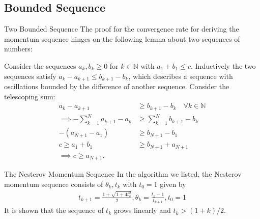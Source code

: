 \documentclass[11pt]{beamer}
\begin{document}
    \subsection{Bounded Sequence}
        \begin{frame}{Two Bounded Sequence}
            The proof for the convergence rate for deriving the momentum sequence hinges on the following lemma about two sequences of numbers:
            \begin{lemma}
                Consider the sequences $a_k, b_k \ge 0$ for $k\in \mathbb N$ with $a_1 + b_1 \le c$. Inductively the two sequences satisfy $a_{k} - a_{k + 1} \le b_{k + 1} - b_k$, which describes a sequence with oscillations bounded by the difference of another sequence. Consider the telescoping sum: 
                \begin{align*}
                    a_{k} - a_{k + 1} 
                    &\ge b_{k + 1} - b_k \quad \forall k \in \mathbb N
                    \\
                    \implies
                    -\sum_{k = 1}^{N}
                    a_{k + 1} - a_k 
                    &\ge 
                    \sum_{k = 1}^{N} b_{k + 1} - b_k
                    \\
                    - (a_{N + 1} - a_1) 
                    &\ge b_{N + 1} - b_1
                    \\
                    c\ge a_1 + b_1
                    &\ge
                    b_{N + 1} + a_{N +1}
                    \\
                    \implies c \ge a_{N+1}. 
                \end{align*}
            \end{lemma}
        \end{frame}    
    \begin{frame}{The Nesterov Momentum Sequence}
        In the algorithm we listed, the Nesterov momentum sequence consists of $\theta_k, t_k$ with $t_0 = 1$ given by
        \begin{align}
            t_{k+1} = \frac{1 + \sqrt{1 + 4t_k^2}}{2}, \theta_k = \frac{t_k - 1}{t_{k + 1}}, t_0 = 1
        \end{align}
        It is shown that the sequence of $t_k$ grows linearly and $t_k > (1 + k)/2$. 
    \end{frame}
\end{document}
